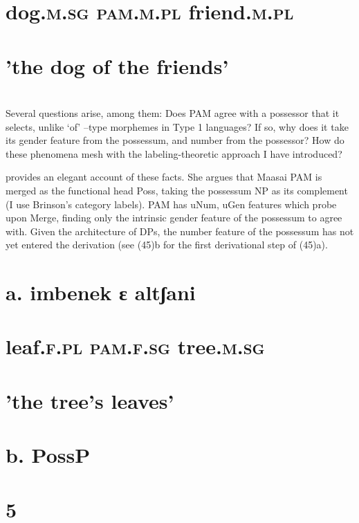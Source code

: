 \documentclass[output=paper
,modfonts
,nonflat]{langsci/langscibook}
\begin{document}
\section{      dog.\textsc{m.sg}  \textsc{pam.m.pl}    friend.\textsc{m.pl}}
\section{      'the dog of the friends'}
\section{}

Several questions arise, among them: Does PAM agree with a possessor that it selects, unlike ‘of’ –type morphemes in Type 1 languages? If so, why does it take its gender feature from the possessum, and number from the possessor? How do these phenomena mesh with the labeling-theoretic approach I have introduced? 

\citealt{Brinson2014} provides an elegant account of these facts. She argues that Maasai PAM is merged as the functional head Poss, taking the possessum NP as its complement (I use Brinson's category labels). PAM has uNum, uGen features which probe upon Merge, finding only the intrinsic gender feature of the possessum to agree with. Given the architecture of DPs, the number feature of the possessum has not yet entered the derivation (see (45)b for the first derivational step of (45)a).

\section{a.  imbenek     ɛ         altʃani}
\label{bkm:Ref490129153}\section{      leaf.\textsc{f.pl}      \textsc{pam.f.sg}  tree.\textsc{m.sg}}
\section{      'the tree's leaves'}
\section{\scshape} 
\section{ b.        PossP}
\section{            5}
\end{document}
